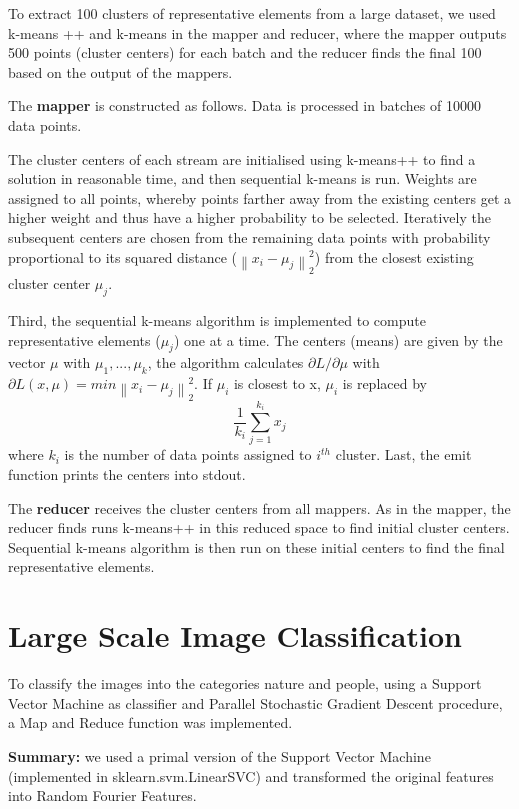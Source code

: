 \documentclass[a4paper, 11pt]{article}
\begin{document}
To extract 100 clusters of representative elements from a large dataset, we used k-means ++ and k-means in the mapper and reducer, where the mapper outputs 500 points (cluster centers) for each batch and the reducer finds the final 100 based on the output of the mappers.

The \textbf{mapper} is constructed as follows. Data is processed in batches of 10000 data points.

The cluster centers of each stream are initialised using k-means++ to find a solution in reasonable time, and then sequential k-means is run. Weights are assigned to all points, whereby points farther away from the existing centers get a higher weight and thus have a higher probability to be selected. Iteratively the subsequent centers are chosen from the remaining data points with probability proportional to its squared distance ($\left \| x_{i} - \mu_{j} \right \|^{2}_{2}$) from the closest existing cluster center $\mu_{j}$.

Third, the sequential k-means algorithm is implemented to compute representative elements ($\mu_{j}$) one at a time. The centers (means) are given by the vector $\mu$ with $\mu_{1},...,\mu_{k}$, the algorithm calculates $\partial L/\partial \mu$ with $ \partial L(x,\mu) = min \left \| x_{i} - \mu_{j} \right \|^{2}_{2}$. If $\mu_{i}$ is closest to x,  $\mu_{i}$ is replaced by $$\frac{1}{k_{i}} \sum_{j=1}^{k_{i}}{x_{j}}$$where $k_i$ is the number of data points assigned to $i^{th}$ cluster. 
Last, the emit function prints the centers into stdout.

The \textbf{reducer} receives the cluster centers from all mappers. As in the mapper, the reducer finds runs k-means++ in this reduced space to find initial cluster centers. Sequential k-means algorithm is then run on these initial centers to find the final representative elements. \pagebreak

\section*{Large Scale Image Classification} 
To classify the images into the categories nature and people, using a Support Vector Machine as classifier and Parallel Stochastic Gradient Descent procedure, a Map and Reduce function was implemented. 

\textbf{Summary:} we used a primal version of the Support Vector Machine (implemented in sklearn.svm.LinearSVC) and transformed the original features into Random Fourier Features.
\end{document}
